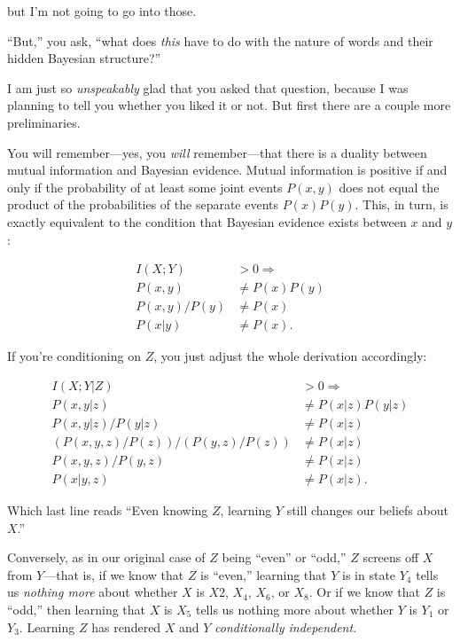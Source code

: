 {
 but I'm not going to go into those. }

{
 ``But,'' you ask,
``what does \textit{this} have to do with the nature
of words and their hidden Bayesian structure?''}

{
 I am just so \textit{unspeakably} glad that you asked that
question, because I was planning to tell you whether you liked it or
not. But first there are a couple more preliminaries.}

{
 You will remember---yes, you \textit{will} remember---that there
is a duality between mutual information and Bayesian evidence. Mutual
information is positive if and only if the probability of at least some
joint events $P(x,y)$ does not equal the product of the probabilities of
the separate events $P(x)P(y)$. This, in turn, is exactly equivalent to
the condition that Bayesian evidence exists between $x$ and $y$:}

\begin{align*}
 I(X;Y) &> 0 \Rightarrow \\
 P(x,y) &\neq P(x)P(y) \\
 P(x,y) / P(y) &\neq P(x) \\
 P(x|y) &\neq P(x).
\end{align*}


{
 If you're conditioning on $Z$, you just adjust the
whole derivation accordingly:}

\begin{align*}
 I(X;Y|Z) &> 0 \Rightarrow \\
 P(x,y|z) &\neq P(x|z)P(y|z) \\
 P(x,y|z) / P(y|z) &\neq P (x|z) \\
 (P(x,y,z)/P(z)) / (P(y,z)/P(z)) &\neq P(x|z) \\
 P(x,y,z) / P(y,z) &\neq P(x|z) \\
 P(x|y,z) &\neq P(x|z).
\end{align*}

{
 Which last line reads ``Even knowing $Z$, learning
$Y$ still changes our beliefs about $X$.''}

{
 Conversely, as in our original case of $Z$ being
``even'' or
``odd,'' $Z$ screens off $X$ from
$Y$---that is, if we know that $Z$ is
``even,'' learning that $Y$ is in
state $Y_{4}$ tells us \textit{nothing more} about whether $X$
is $X{2}$, $X_{4}$, $X_{6}$, or
$X_{8}$. Or if we know that $Z$ is
``odd,'' then learning that $X$ is
$X_{5}$ tells us nothing more about whether $Y$ is
$Y_{1}$ or $Y_{3}$. Learning $Z$ has rendered $X$ and
$Y$ \textit{conditionally independent}.}

